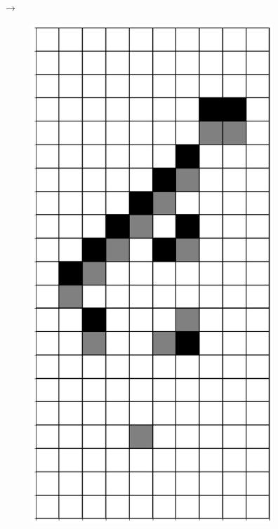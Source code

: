 \documentclass[12pt]{article}
\numberwithin{figure}{section} %
\begin{document}
\begin{figure}[H]
\begin{subfigure}{0.3\textwidth}
     \subcaption{}
   \end{subfigure}
      {\LARGE$\xrightarrow{}$}
      \newline
   \begin{subfigure}{0.3\textwidth}
     \centering
     \includegraphics[angle=270,width=\linewidth]{Section4/23.6}

\end{subfigure}
\end{figure}
\end{document}
